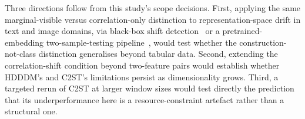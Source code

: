 \documentclass[conference]{IEEEtran}
\begin{document}
Three directions follow from this study's scope decisions. First, applying the same marginal-visible versus correlation-only distinction to representation-space drift in text and image domains, via black-box shift detection~\cite{lipton2018} or a pretrained-embedding two-sample-testing pipeline~\cite{rabanser2019}, would test whether the construction-not-class distinction generalises beyond tabular data. Second, extending the correlation-shift condition beyond two-feature pairs would establish whether HDDDM's and C2ST's limitations persist as dimensionality grows. Third, a targeted rerun of C2ST at larger window sizes would test directly the prediction that its underperformance here is a resource-constraint artefact rather than a structural one.



\end{document}
